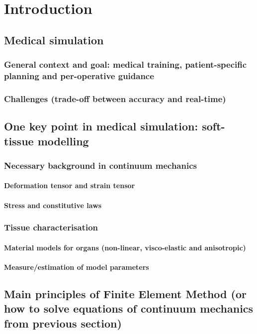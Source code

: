 \part{Introduction}

	\chapter{Medical simulation}
		\section{General context and goal: medical training, patient-specific planning and per-operative guidance}
		\section{Challenges (trade-off between accuracy and real-time)}

	\chapter{One key point in medical simulation: soft-tissue modelling}
		\section{Necessary background in continuum mechanics}
			\subsection{Deformation tensor and strain tensor}
			\subsection{Stress and constitutive laws}
		\section{Tissue characterisation}
			\subsection{Material models for organs (non-linear, visco-elastic and anisotropic)}
			\subsection{Measure/estimation of model parameters}

	\chapter{Main principles of Finite Element Method (or how to solve equations of continuum mechanics from previous section)}
